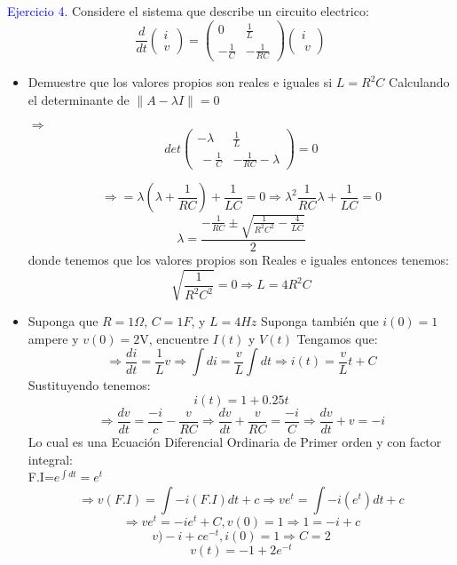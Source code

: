 \textcolor{blue}{Ejercicio 4.}
Considere el sistema que describe un circuito electrico:
$$\frac{d}{dt}\begin{pmatrix}i\\ v\end{pmatrix}=\begin{pmatrix}0&\frac{1}{L}\\ -\frac{1}{C}&-\frac{1}{RC}\end{pmatrix}\begin{pmatrix}i\\ \:v\end{pmatrix}$$

\begin{itemize}
    \item  Demuestre que los valores propios son reales e iguales si $L=R^2C$
    Calculando el determinante de $\|A-\lambda I\|=0$
    
    $\Rightarrow$
    $$ det \begin{pmatrix}-\lambda &\frac{1}{L}\\ \:-\frac{1}{C}&-\frac{1}{RC}-\lambda \end{pmatrix}=0$$
    
    $$\Rightarrow=\lambda(\lambda+\frac{1}{RC})+\frac{1}{LC}=0 \Rightarrow \lambda^2\frac{1}{RC}\lambda+\frac{1}{LC}=0$$
    $$\lambda=\frac{-\frac{1}{RC}\pm \sqrt{\frac{1}{R^2C^2}-\frac{4}{LC}}}{2}$$
    donde tenemos que los valores propios son Reales e iguales
    entonces tenemos:
    $$\sqrt{\frac{1}{R^2C^2}}=0\Rightarrow L=4R^2C$$
    
    \item Suponga que $R= 1\Omega$, $C=1F$, y $L=4Hz$ Suponga también que $i(0)=1$ ampere y $v(0)=2$V, encuentre $I(t)$ y $V(t)$
    Tengamos que:
        $$\Rightarrow \frac{di}{dt}=\frac{1}{L}v \Rightarrow \int di=\frac{v}{L}\int dt \Rightarrow i\left(t\right)=\frac{v}{L}t+C$$
        Sustituyendo tenemos:
        $$i(t)=1+0.25t$$
        $$\Rightarrow \frac{dv}{dt}=\frac{-i}{c}-\frac{v}{RC} \Rightarrow \frac{dv}{dt}+\frac{v}{RC}=\frac{-i}{C} \Rightarrow \frac{dv}{dt}+v=-i$$
        Lo cual es una Ecuación Diferencial Ordinaria de Primer orden
        y con factor integral:\\
        
        F.I=$e^{\int dt}=e^t$
        $$\Rightarrow v(F.I)=\int -i(F.I)dt+c \Rightarrow ve^t=\int -i(e^t)dt+c$$
        $$\Rightarrow ve^t=-ie^t+C, v(0)=1 \Rightarrow 1=-i+c$$
        $$v)-i+ce^{-t}, i(0)=1 \Rightarrow C=2$$
        $$v(t)=-1+2e^{-t}$$

\end{itemize}